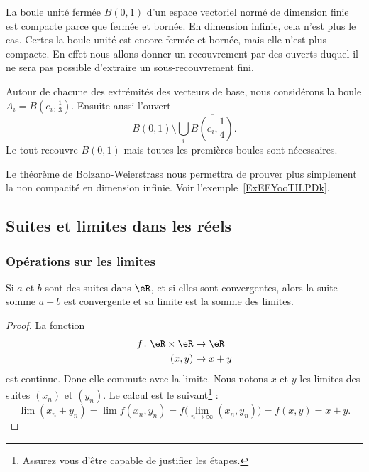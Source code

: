 \begin{example}
    La boule unité fermée \( \overline{ B(0,1) }\) d'un espace vectoriel normé de dimension finie est compacte parce que fermée et bornée. En dimension infinie, cela n'est plus le cas. Certes la boule unité est encore fermée et bornée, mais elle n'est plus compacte. En effet nous allons donner un recouvrement par des ouverts duquel il ne sera pas possible d'extraire un sous-recouvrement fini.

    Autour de chacune des extrémités des vecteurs de base, nous considérons la boule \( A_i=B(e_i,\frac{1}{ 3 })\). Ensuite aussi l'ouvert
    \begin{equation}
        B(0,1)\setminus\bigcup_i\overline{ B(e_i,\frac{1}{ 4 })}.
    \end{equation}
    Le tout recouvre \( B(0,1)\) mais toutes les premières boules sont nécessaires.
\end{example}

Le théorème de Bolzano-Weierstrass nous permettra de prouver plus simplement la non compacité en dimension infinie. Voir l'exemple~\ref{ExEFYooTILPDk}.
\subsection{Suites et limites dans les réels}

\label{SECooLLUGooOwZRyI}


\subsubsection{Opérations sur les limites}

\begin{lemma}       \label{LEMooSFBLooKSXiyj}
    Si \( a\) et \( b\) sont des suites dans \( \eR\), et si elles sont convergentes, alors la suite somme \( a+b\) est convergente et sa limite est la somme des limites.
\end{lemma}

\begin{proof}
    La fonction 
    \begin{equation}
        \begin{aligned}
            f\colon \eR\times \eR&\to \eR \\
            (x,y)&\mapsto x+y 
        \end{aligned}
    \end{equation}
    est continue. Donc elle commute avec la limite. Nous notons \( x\) et \( y\) les limites des suites \( (x_n)\) et \( (y_n)\). Le calcul est le suivant\footnote{Assurez vous d'être capable de justifier les étapes.} :
    \begin{equation}
        \lim (x_n+y_n)=\lim f(x_n,y_n)=f\big( \lim_{n\to \infty} (x_n,y_n) \big)=f(x,y)=x+y.
    \end{equation}
\end{proof}

